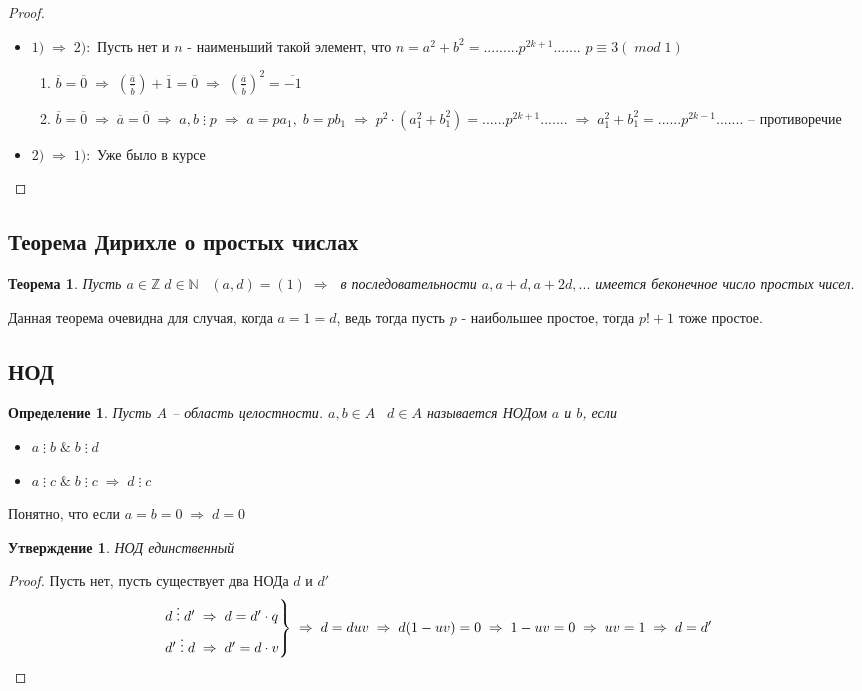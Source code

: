 \documentclass[12pt, a4paper]{article}
\newcommand{\nat}{\mathds{N}}
\newcommand{\ra}{\;\Rightarrow\;}
\newcommand{\Z}{\mathds{Z}}
\newcommand{\cl}[1]{\overline{#1}}
\newcommand{\de}{\;\vdots\;}
\theoremstyle{plain}
\newtheorem*{Th*}{Теорема}
\newtheorem{Def}{Определение}
\newtheorem*{Statement*}{Утверждение}
\theoremstyle{definition}
\begin{document}
\begin{proof}~\\
    \begin{itemize}
        \item $1)\ra2):$ Пусть нет и $n$ - наименьший такой элемент, что $n = a^2+b^2 = .........p^{2k+1}.......$
        $p \equiv 3(\; mod \; 1)$
        \begin{enumerate}
            \item $\cl{b} = \cl{0}\ra \left(\frac{\cl{a}}{\cl{b}}\right)+\cl{1} = \cl{0}\ra {\left(\frac{\cl{a}}{\cl{b}}\right)}^2 = \cl{-1}$
            \item $\cl{b} = \cl{0}\ra \cl{a} = \cl{0}\ra a,b\de p\ra a = pa_1,\;b=pb_1\ra p^2\cdot(a_1^2+b_1^2) = ......p^{2k+1}.......\ra a_1^2+b_1^2 = ......p^{2k-1}.......$ -- противоречие 
        \end{enumerate}
        \item $2)\ra1):$ Уже было в курсе
    \end{itemize}
\end{proof}
\subsection*{Теорема Дирихле о простых числах}
\begin{Th*}
    Пусть $a\in\Z\; d\in \nat\;\;\; (a,d) = (1) \ra $ в последовательности $a,a+d,a+2d,...$ имеется беконечное число простых чисел. 
\end{Th*}
Данная теорема очевидна для случая, когда $a = 1 = d$, ведь тогда пусть $p$ - наибольшее простое, тогда $p!+1$ тоже простое.
\subsection*{НОД}
\begin{Def}
    Пусть $A$ -- область целостности. $a,b\in A\;\;\; d\in A$ называется НОДом $a$ и $b$, если
    \begin{itemize}
        \item $a\de b\; \&\; b\de d$
        \item $a\de c \;\&\; b\de c \ra d\de c$
    \end{itemize}
\end{Def}
Понятно, что если $a = b = 0 \ra d = 0$
\begin{Statement*}
    НОД единственный
\end{Statement*}
\begin{proof}
    Пусть нет, пусть существует два НОДа $d$ и $d'$
    \begin{equation*}
        \begin{rcases}
            d\de d'\ra d = d'\cdot q\\
            d'\de d \ra d' = d\cdot v
        \end{rcases}
        \ra d = duv\ra d(1-uv) = 0\ra 1-uv = 0\ra uv = 1\ra d = d'
    \end{equation*}
\end{proof}
\end{document}

